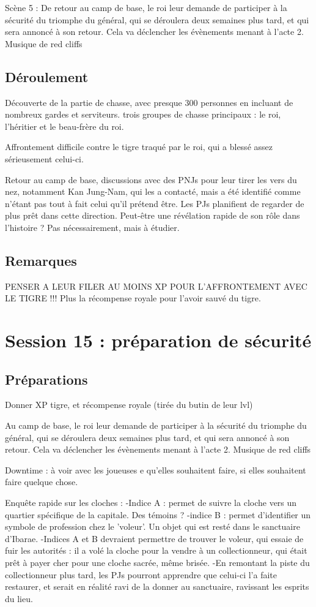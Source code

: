 \documentclass[10pt,a4paper]{book}
\begin{document}
Scène 5 : De retour au camp de base, le roi leur demande de participer à la sécurité du triomphe du général, qui se déroulera deux semaines plus tard, et qui sera annoncé à son retour. Cela va déclencher les évènements menant à l'acte 2. Musique de red cliffs
\subsection{Déroulement}
Découverte de la partie de chasse, avec presque 300 personnes en incluant de nombreux gardes et serviteurs. trois groupes de chasse principaux : le roi, l'héritier et le beau-frère du roi. 

Affrontement difficile contre le tigre traqué par le roi, qui a blessé assez sérieusement celui-ci.

Retour au camp de base, discussions avec des PNJs pour leur tirer les vers du nez, notamment Kan Jung-Nam, qui les a contacté, mais a été identifié comme n'étant pas tout à fait celui qu'il prétend être. Les PJs planifient de regarder de plus prêt dans cette direction. Peut-être une révélation rapide de son rôle dans l'histoire ? Pas nécessairement, mais à étudier.
\subsection{Remarques}
PENSER A LEUR FILER AU MOINS XP POUR L'AFFRONTEMENT AVEC LE TIGRE !!! Plus la récompense royale pour l'avoir sauvé du tigre.
\section{Session 15 : préparation de sécurité}
\subsection{Préparations}
Donner XP tigre, et récompense royale (tirée du butin de leur lvl)

Au camp de base, le roi leur demande de participer à la sécurité du triomphe du général, qui se déroulera deux semaines plus tard, et qui sera annoncé à son retour. Cela va déclencher les évènements menant à l'acte 2. Musique de red cliffs

Downtime : à voir avec les joueuses e qu'elles souhaitent faire, si elles souhaitent faire quelque chose.

Enquête rapide sur les cloches : 
-Indice A : permet de suivre la cloche vers un quartier spécifique de la capitale. Des témoins ?
-indice B : permet d'identifier un symbole de profession chez le 'voleur'. Un objet qui est resté dans le sanctuaire d'Ibarae.
-Indices A et B devraient permettre de trouver le voleur, qui essaie de fuir les autorités : il a volé la cloche pour la vendre à un collectionneur, qui était prêt à payer cher pour une cloche sacrée, même brisée.
-En remontant la piste du collectionneur plus tard, les PJs pourront apprendre que celui-ci l'a faite restaurer, et serait en réalité ravi de la donner au sanctuaire, ravissant les esprits du lieu.
\end{document}
